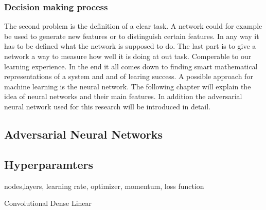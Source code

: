 \subsubsection{Decision making process}


The second problem is the definition of a clear task. A network could for example be used to generate new features or to distinguish certain features. In any way it has to be defined what the network is supposed to do.
The last part is to give a network a way to measure how well it is doing at out task. Comperable to our learning experience.
In the end it all comes down to finding smart mathematical representations of a system and and of learing success.
A possible approach for machine learning is the neural network. The following chapter will explain the idea of neural networks and their main features. In addition the adversarial neural network used for this research will be introduced in detail. 

\subsection{Adversarial Neural Networks}

\subsection{Hyperparamters}

nodes,layers, learning rate, optimizer, momentum, loss function

Convolutional Dense Linear

